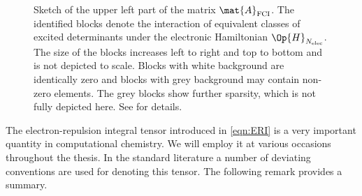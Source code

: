 \begin{figure}
	\centering
	\caption[Sketch of the the full-configuration-interaction matrix]{
		Sketch of the upper left part of the \FCI matrix $\mat{A}_\text{FCI}$.
		The identified blocks denote the
		interaction of equivalent classes of excited determinants
		under the electronic Hamiltonian $\Op{H}_{\Nelec}$.
		The size of the blocks increases left to right and top to bottom
		and is not depicted to scale.
		Blocks with white background are identically zero
		and blocks with grey background may contain non-zero elements.
		The grey blocks show further
		sparsity, which is not fully depicted here.
		See \cite{Soerensen2016} for details.
	}
	\label{fig:StructureFCIMatrix}
\end{figure}

The electron-repulsion integral tensor introduced in \eqref{eqn:ERI}
is a very important quantity in computational chemistry.
We will employ it at various occasions throughout the thesis.
In the standard literature a number of deviating conventions are used
for denoting this tensor. The following remark provides a summary.

